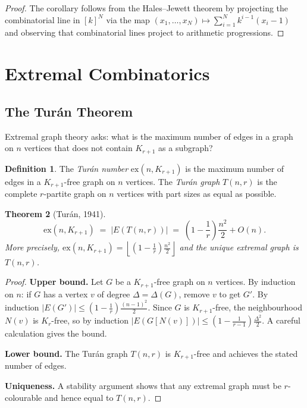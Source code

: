 \documentclass[12pt,a4paper]{amsart}
\newtheorem{theorem}{Theorem}[section]
\theoremstyle{definition}
\newtheorem{definition}[theorem]{Definition}
\theoremstyle{remark}
\begin{document}
\begin{proof}
The corollary follows from the Hales--Jewett theorem by projecting the
combinatorial line in $[k]^N$ via the map $(x_1,\ldots,x_N) \mapsto
\sum_{i=1}^N k^{i-1}(x_i - 1)$ and observing that combinatorial lines project
to arithmetic progressions.
\end{proof}

\section{Extremal Combinatorics}

\subsection{The Tur\'an Theorem}

Extremal graph theory asks: what is the maximum number of edges in a graph on $n$
vertices that does not contain $K_{r+1}$ as a subgraph?

\begin{definition}
The \emph{Tur\'an number} $\mathrm{ex}(n, K_{r+1})$ is the maximum number of edges
in a $K_{r+1}$-free graph on $n$ vertices.  The \emph{Tur\'an graph} $T(n,r)$ is
the complete $r$-partite graph on $n$ vertices with part sizes as equal as possible.
\end{definition}

\begin{theorem}[Tur\'an, 1941]\label{thm:turan}
\[
  \mathrm{ex}(n, K_{r+1}) \;=\; |E(T(n,r))| \;=\; \left(1 - \frac{1}{r}\right)\frac{n^2}{2}
  + O(n).
\]
More precisely, $\mathrm{ex}(n, K_{r+1}) = \left\lfloor\left(1 - \frac{1}{r}\right)\frac{n^2}{2}\right\rfloor$
and the unique extremal graph is $T(n,r)$.
\end{theorem}

\begin{proof}
\textbf{Upper bound.}  Let $G$ be a $K_{r+1}$-free graph on $n$ vertices.  By
induction on $n$: if $G$ has a vertex $v$ of degree $\Delta = \Delta(G)$, remove
$v$ to get $G'$.  By induction $|E(G')| \le \left(1-\frac{1}{r}\right)\frac{(n-1)^2}{2}$.
Since $G$ is $K_{r+1}$-free, the neighbourhood $N(v)$ is $K_r$-free, so by
induction $|E(G[N(v)])| \le \left(1-\frac{1}{r-1}\right)\frac{\Delta^2}{2}$.
A careful calculation gives the bound.

\textbf{Lower bound.}  The Tur\'an graph $T(n,r)$ is $K_{r+1}$-free and achieves
the stated number of edges.

\textbf{Uniqueness.}  A stability argument shows that any extremal graph must be
$r$-colourable and hence equal to $T(n,r)$.
\end{proof}
\end{document}

